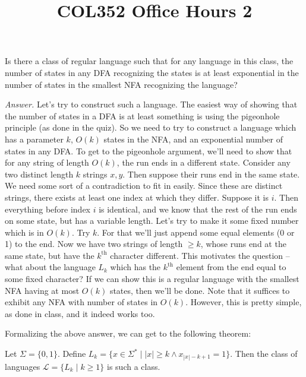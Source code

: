 \documentclass[a4paper]{article}
\title{\textbf{COL352 Office Hours 2}}
\date{}
\newenvironment{ans}{\begin{breakbox}\textit{Answer.}}{\end{breakbox}}
\newcommand{\nl}{\vspace{0.2cm}\\}
\newcommand{\mc}{\mathcal}
\renewcommand{\L}{\mc{L}}
\begin{document}
\maketitle

\begin{ques}
    Is there a class of regular language such that for any language in this class, the number of states in any DFA recognizing the states is at least exponential in the number of states in the smallest NFA
    recognizing the language?
\end{ques}

\begin{ans}
    Let's try to construct such a language. The easiest way of showing that the number of states in a DFA is at least something is using the pigeonhole principle (as done in the quiz). So we need
    to try to construct a language which has a parameter $k$, $O(k)$ states in the NFA, and an exponential number of states in any DFA. To get to the pigeonhole argument, we'll need to show that for
    any string of length $O(k)$, the run ends in a different state. Consider any two distinct length $k$ strings $x, y$. Then suppose their runs end in the same state. We need some sort of a
    contradiction to fit in easily. Since these are distinct strings, there exists at least one index at which they differ. Suppose it is $i$. Then everything before index $i$ is identical, and we
    know that the rest of the run ends on some state, but has a variable length. Let's try to make it some fixed number which is in $O(k)$. Try $k$. For that we'll just append some equal elements (0 or 1) to
    the end. Now we have two strings of length $\ge k$, whose runs end at the same state, but have the $k^\mathrm{th}$ character different. This motivates the question -- what about the language
    $L_k$ which has the $k^\mathrm{th}$ element from the end equal to some fixed character? If we can show this is a regular language with the smallest NFA having at most $O(k)$ states, then we'll be
    done. Note that it suffices to exhibit any NFA with number of states in $O(k)$. However, this is pretty simple, as done in class, and it indeed works too.
\end{ans}

Formalizing the above answer, we can get to the following theorem:\nl

\begin{theorem}
    Let $\Sigma = \{0, 1\}$. Define $L_k = \{x \in \Sigma^* \mid |x| \ge k \land x_{|x| - k + 1} = 1\}$. Then the class of languages $\L = \{L_k \mid k \ge 1\}$ is such a class.
\end{theorem}
\end{document}
